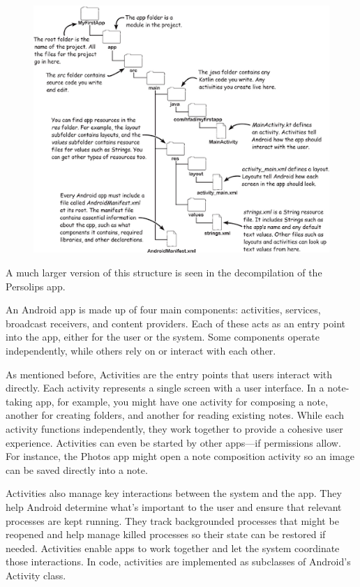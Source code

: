 \begin{figure}
	\centering
	\includegraphics[width=0.7\linewidth]{gradle_build_structure}
	\caption{}
	\label{fig:gradlebuildstructure}
\end{figure}
A much larger version of this structure is seen in the decompilation of the Persolips app. 

An Android app is made up of four main components: activities, services, broadcast receivers, and content providers. Each of these acts as an entry point into the app, either for the user or the system. Some components operate independently, while others rely on or interact with each other.

As mentioned before, Activities are the entry points that users interact with directly. Each activity represents a single screen with a user interface. In a note-taking app, for example, you might have one activity for composing a note, another for creating folders, and another for reading existing notes. While each activity functions independently, they work together to provide a cohesive user experience. Activities can even be started by other apps—if permissions allow. For instance, the Photos app might open a note composition activity so an image can be saved directly into a note.

Activities also manage key interactions between the system and the app. They help Android determine what’s important to the user and ensure that relevant processes are kept running. They track backgrounded processes that might be reopened and help manage killed processes so their state can be restored if needed. Activities enable apps to work together and let the system coordinate those interactions. In code, activities are implemented as subclasses of Android’s Activity class.

